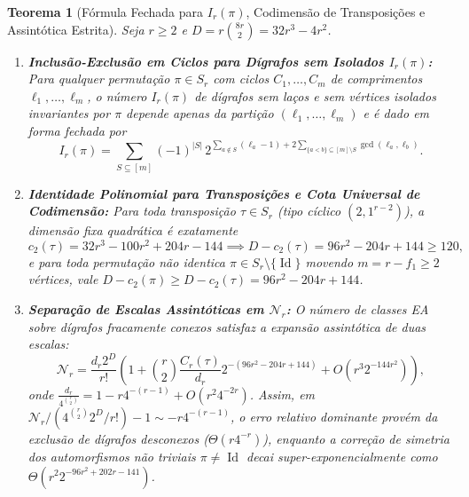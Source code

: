 \documentclass[11pt,a4paper]{article}
\newtheorem{theorem}{Teorema}[section]
\theoremstyle{definition}
\theoremstyle{remark}
\newcommand{\Id}{\operatorname{Id}}
\begin{document}
\begin{theorem}[Fórmula Fechada para $I_r(\pi)$, Codimensão de Transposições e Assintótica Estrita]\label{thm:task_b_asymptotic}
Seja $r \ge 2$ e $D = r\binom{8r}{2} = 32r^3 - 4r^2$.
\begin{enumerate}
  \item \textbf{Inclusão-Exclusão em Ciclos para Dígrafos sem Isolados $I_r(\pi)$:} Para qualquer permutação $\pi \in S_r$ com ciclos $C_1,\dots,C_m$ de comprimentos $\ell_1,\dots,\ell_m$, o número $I_r(\pi)$ de dígrafos sem laços e sem vértices isolados invariantes por $\pi$ depende apenas da partição $(\ell_1,\dots,\ell_m)$ e é dado em forma fechada por
  \begin{equation}\label{eq:Ir_closed}
    I_r(\pi) = \sum_{S \subseteq [m]} (-1)^{|S|} \, 2^{\sum_{a \notin S} (\ell_a - 1) + 2 \sum_{\{a < b\} \subseteq [m]\setminus S} \gcd(\ell_a, \ell_b)}.
  \end{equation}
  \item \textbf{Identidade Polinomial para Transposições e Cota Universal de Codimensão:} Para toda transposição $\tau \in S_r$ (tipo cíclico $(2, 1^{r-2})$), a dimensão fixa quadrática é exatamente
  \begin{equation}\label{eq:c2_tau}
    c_2(\tau) = 32r^3 - 100r^2 + 204r - 144 \implies D - c_2(\tau) = 96r^2 - 204r + 144 \ge 120,
  \end{equation}
  e para toda permutação não identica $\pi \in S_r \setminus \{\Id\}$ movendo $m = r - f_1 \ge 2$ vértices, vale $D - c_2(\pi) \ge D - c_2(\tau) = 96r^2 - 204r + 144$.
  \item \textbf{Separação de Escalas Assintóticas em $\mathcal{N}_r$:} O número de classes EA sobre dígrafos fracamente conexos satisfaz a expansão assintótica de duas escalas:
  \begin{equation}\label{eq:asymptotic_two_scales}
    \mathcal{N}_r = \frac{d_r 2^D}{r!}\left(1 + \binom{r}{2}\frac{C_r(\tau)}{d_r} 2^{-(96r^2 - 204r + 144)} + O\!\left(r^3 2^{-144r^2}\right)\right),
  \end{equation}
  onde $\frac{d_r}{4^{\binom{r}{2}}} = 1 - r 4^{-(r-1)} + O(r^2 4^{-2r})$. Assim, em $\mathcal{N}_r / (4^{\binom{r}{2}} 2^D / r!) - 1 \sim -r 4^{-(r-1)}$, o erro relativo dominante provém da exclusão de dígrafos desconexos ($\Theta(r 4^{-r})$), enquanto a correção de simetria dos automorfismos não triviais $\pi \neq \Id$ decai super-exponencialmente como $\Theta(r^2 2^{-96r^2 + 202r - 141})$.
\end{enumerate}
\end{theorem}
\end{document}
